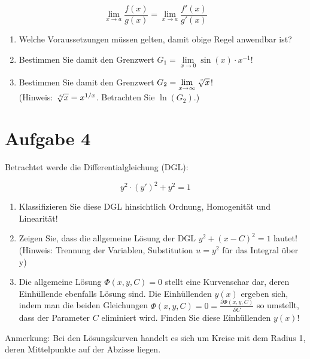 \documentclass[12pt]{article}
\begin{document}
$$\lim\limits_{x \to a} \frac{f(x)}{g(x)} = \lim\limits_{x \to a} \frac{f'(x)}{g'(x)} $$

\begin{enumerate}[label=(\alph*)]
\item Welche Voraussetzungen müssen gelten, damit obige Regel anwendbar ist?
\item Bestimmen Sie damit den Grenzwert $G_1 = \lim\limits_{x\to 0}\sin(x) \cdot x^{-1}$!
\item Bestimmen Sie damit den Grenzwert $G_2 = \lim\limits_{x\to\infty}\sqrt[\leftroot{-2}\uproot{2}x]{x}$!\\
(Hinweis: $\sqrt[\leftroot{-2}\uproot{2}x]{x} = x^{1/x}$. Betrachten Sie $\ln(G_2)$.)
\end{enumerate}

\newpage
\section* {Aufgabe 4}

Betrachtet werde die Differentialgleichung (DGL):

$$y^2 \cdot (y')^2 + y^2 = 1$$

\begin{enumerate}[label=(\alph*)]
\item Klassifizieren Sie diese DGL hinsichtlich Ordnung, Homogenität und Linearität!
\item Zeigen Sie, dass die allgemeine Lösung der DGL $y^2+(x-C)^2 = 1$ lautet!\\
(Hinweis: Trennung der Variablen, Substitution $u=y^2$ für das Integral über y)
\item Die allgemeine Lösung $\Phi(x,y,C)=0$ stellt eine Kurvenschar dar, deren Einhüllende ebenfalls Lösung sind. Die Einhüllenden $y(x)$ ergeben sich, indem man die beiden Gleichungen $\Phi(x,y,C) = 0 = \frac{\partial \Phi(x,y,C)}{\partial C}$ so umstellt, dass der Parameter $C$ eliminiert wird. Finden Sie diese Einhüllenden $y(x)$!
\end{enumerate}

Anmerkung: Bei den Lösungskurven handelt es sich um Kreise mit dem Radius 1, deren Mittelpunkte auf der Abzisse liegen.
\end{document}
